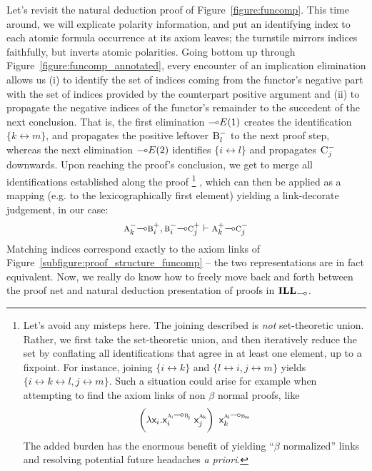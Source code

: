 Let's revisit the natural deduction proof of Figure~\ref{figure:funcomp}.
This time around, we will explicate polarity information, and put an identifying index to each atomic formula occurrence at its axiom leaves; 
the turnstile mirrors indices faithfully, but inverts atomic polarities.
Going bottom up through Figure~\ref{figure:funcomp_annotated}, every encounter of an implication elimination allows us (i) to identify the set of indices coming from the functor's negative part with the set of indices provided by the counterpart positive argument and (ii) to propagate the negative indices of the functor's remainder to the succedent of the next conclusion.
That is, the first elimination $\li E(1)$ creates the identification $\{k \leftrightarrow m\}$, and propagates the positive leftover $\normalfont\textsc{B}^{-}_l$ to the next proof step, whereas the next elimination $\li E(2)$ identifies $\{i \leftrightarrow l\}$ and propagates $\normalfont\textsc{C}^{-}_j$ downwards.
Upon reaching the proof's conclusion, we get to merge all identifications established along the proof%
\footnote{
Let's avoid any misteps here. The joining described is \textit{not} set-theoretic union. Rather, we first take the set-theoretic union, and then iteratively reduce the set by conflating all identifications that agree in at least one element, up to a fixpoint.
For instance, joining $\{ i \leftrightarrow k\}$ and $\{ l\leftrightarrow i, j \leftrightarrow m\}$ yields $\{i \leftrightarrow k \leftrightarrow l, j \leftrightarrow m \}$. Such a situation could arise for example when attempting to find the axiom links of non $\beta$ normal proofs, like
\[
\term{\left(\lam \vari.\vari^{\prop{a}_i \li \prop{b}_j}~\varj^{\prop{a}_k}\right)~\vark^{\prop{a}_l \li \prop{b}_m}}
\]
The added burden has the enormous benefit of yielding ``$\beta$ normalized'' links and resolving potential future headaches \textit{a priori}.
}%
, which can then be applied as a mapping (e.g. to the lexicographically first element) yielding a link-decorate judgement, in our case:
\[
	\nprop{a}_k \li \pprop{b}_i, \nprop{b}_i \li \pprop{c}_j \vdash \pprop{a}_k \li \nprop{c}_j
\]
Matching indices correspond exactly to the axiom links of Figure~\ref{subfigure:proof_structure_funcomp} -- the two representations are in fact equivalent.
Now, we really do know how to freely move back and forth between the proof net and natural deduction presentation of proofs in $\ILL_{\li}$.

